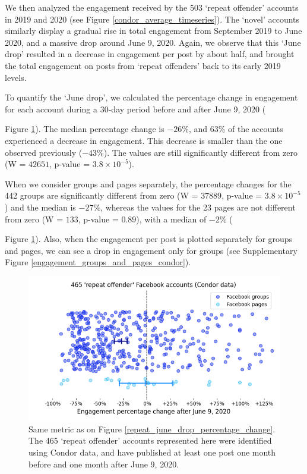\documentclass[review]{elsarticle}
\begin{document}
We then analyzed the engagement received by the 503 `repeat offender' accounts in 2019 and 2020 (see Figure \ref{condor_average_timeseries}).
The `novel' accounts similarly display a gradual rise in total engagement from September 2019 to June 2020, and a massive drop around June 9, 2020.
Again, we observe that this `June drop' resulted in a decrease in engagement per post by about half, and brought the total engagement on posts from ‘repeat offenders’ back to its early 2019 levels.

To quantify the ‘June drop’, we calculated the percentage change in engagement for each account during a 30-day period before and after June 9, 2020 ({Figure \ref{condor_june_drop_percentage_change}).
The median percentage change is $-26\%$, and $63\%$ of the accounts experienced a decrease in engagement. 
This decrease is smaller than the one observed previously ($-43\%$).
The values are still significantly different from zero (W = $42651$, p-value = $3.8 \times 10^{-5}$).

When we consider groups and pages separately, the percentage changes for the 442 groups are significantly different from zero (W = $37889$, p-value = $3.8 \times 10^{-5}$) and the median is $-27\%$, whereas the values for the 23 pages are not different from zero (W = $133$, p-value = $0.89$), with a median of $-2\%$ ({Figure \ref{condor_june_drop_percentage_change}).
Also, when the engagement per post is plotted separately for groups and pages, we can see a drop in engagement only for groups (see Supplementary Figure \ref{engagement_groups_and_pages_condor}).

\begin{figure}[!h]
\centering
\includegraphics[scale=0.5]{./../figure/condor_june_drop_percentage_change.png}
\caption{
Same metric as on Figure \ref{repeat_june_drop_percentage_change}.
The 465 `repeat offender' accounts represented here were identified using Condor data, and have published at least one post one month before and one month after June 9, 2020.
}
\label{condor_june_drop_percentage_change}
\end{figure}

}}
\end{document}
